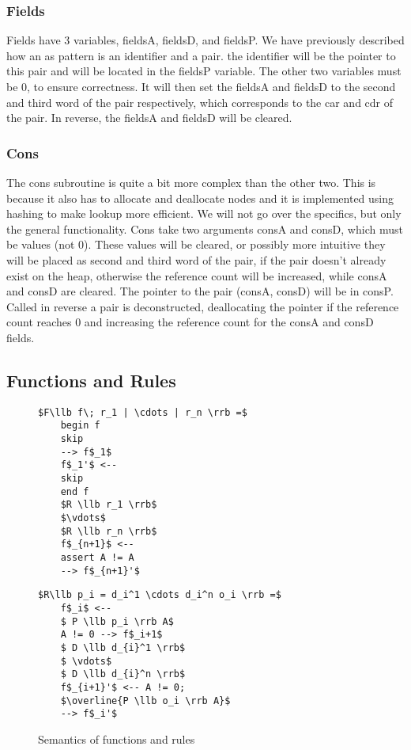 \documentclass[a4paper]{article}
\begin{document}
\subsubsection{Fields}
\label{sec:org7546fa2}
Fields have 3 variables, fieldsA, fieldsD, and fieldsP. We have previously described how an as pattern is an identifier and a pair. the identifier will be the pointer to this pair and will be located in the fieldsP variable. The other two variables must be 0, to ensure correctness. It will then set the fieldsA and fieldsD to the second and third word of the pair respectively, which corresponds to the car and cdr of the pair. In reverse, the fieldsA and fieldsD will be cleared.
\subsubsection{Cons}
\label{sec:org7c22514}
The cons subroutine is quite a bit more complex than the other two. This is because it also has to allocate and deallocate nodes and it is implemented using hashing to make lookup more efficient. We will not go over the specifics, but only the general functionality. Cons take two arguments consA and consD, which must be values (not 0). These values will be cleared, or possibly more intuitive they will be placed as second and third word of the pair, if the pair doesn't already exist on the heap, otherwise the reference count will be increased, while consA and consD are cleared. The pointer to the pair (consA, consD) will be in consP. Called in reverse a pair is deconstructed, deallocating the pointer if the reference count reaches 0 and increasing the reference count for the consA and consD fields.
\subsection{Functions and Rules}
\label{sec:orgadc53c6}
\begin{figure}[!htb]
\begin{minipage}{0.4\textwidth}
\begin{lstlisting}
$F\llb f\; r_1 | \cdots | r_n \rrb =$
    begin f
    skip
    --> f$_1$
    f$_1'$ <--
    skip
    end f
    $R \llb r_1 \rrb$
    $\vdots$
    $R \llb r_n \rrb$
    f$_{n+1}$ <--
    assert A != A
    --> f$_{n+1}'$
\end{lstlisting}
\end{minipage}
\qquad
\begin{minipage}{0.4\textwidth}
\begin{lstlisting}
$R\llb p_i = d_i^1 \cdots d_i^n o_i \rrb =$
    f$_i$ <--
    $ P \llb p_i \rrb A$
    A != 0 --> f$_i+1$
    $ D \llb d_{i}^1 \rrb$
    $ \vdots$
    $ D \llb d_{i}^n \rrb$
    f$_{i+1}'$ <-- A != 0;
    $\overline{P \llb o_i \rrb A}$
    --> f$_i'$
\end{lstlisting}
\end{minipage}

\caption{Semantics of functions and rules}
\label{rules}
\end{figure}
\end{document}
